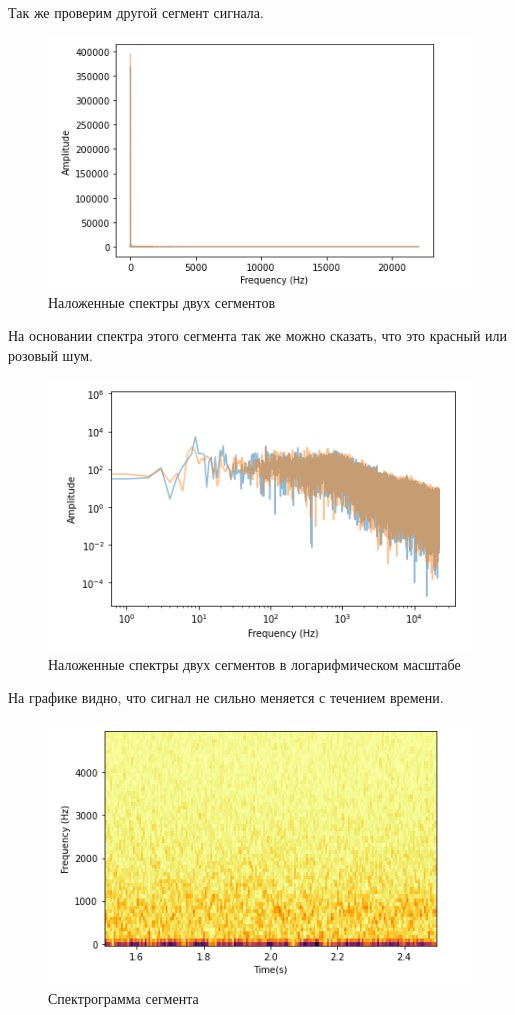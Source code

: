 \documentclass[a4paper, 14pt]{extarticle}
\begin{document}
    Так же проверим другой сегмент сигнала.

    \begin{figure}[H]
        \centering
        \includegraphics[width=0.8\linewidth]{wind_segment_1_and_2_spectr}
        \caption{Наложенные спектры двух сегментов}
        \label{fig:wind_segment_1_and_2_spectr}
    \end{figure}

    На основании спектра этого сегмента так же можно сказать, что это красный или розовый шум.

    \begin{figure}[H]
        \centering
        \includegraphics[width=0.8\linewidth]{wind_segment_1_and_2_spectr_log}
        \caption{Наложенные спектры двух сегментов в логарифмическом масштабе}
        \label{fig:wind_segment_1_and_2_spectr_log}
    \end{figure}

    На графике видно, что сигнал не сильно меняется с течением времени.

    \begin{figure}[H]
        \centering
        \includegraphics[width=0.8\linewidth]{wind_segment_spectrogram}
        \caption{Спектрограмма сегмента}
        \label{fig:wind_segment_spectrogram}
    \end{figure}
\end{document}
